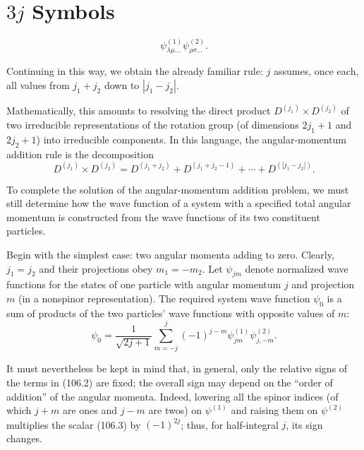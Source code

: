 \section{$3j$ Symbols}




\begin{equation}
 \psi^{(1)}_{\lambda\mu\ldots}\psi^{(2)}_{\rho\sigma\ldots}.
 \tag{106.1}
\end{equation}


Continuing in this way, we obtain the already familiar rule: $j$ assumes, once each, all values from $j_1+j_2$ down to $|j_1-j_2|$.

Mathematically, this amounts to resolving the direct product $D^{(j_1)}\times D^{(j_2)}$ of two irreducible representations of the rotation group (of dimensions $2j_1+1$ and $2j_2+1$) into irreducible components. In this language, the angular-momentum addition rule is the decomposition
\[
 D^{(j_1)}\times D^{(j_2)}=D^{(j_1+j_2)}+D^{(j_1+j_2-1)}+\cdots+D^{(|j_1-j_2|)}.
\]

To complete the solution of the angular-momentum addition problem, we must still determine how the wave function of a system with a specified total angular momentum is constructed from the wave functions of its two constituent particles.

Begin with the simplest case: two angular momenta adding to zero. Clearly, $j_1=j_2$ and their projections obey $m_1=-m_2$. Let $\psi_{jm}$ denote normalized wave functions for the states of one particle with angular momentum $j$ and projection $m$ (in a nonspinor representation). The required system wave function $\psi_0$ is a sum of products of the two particles' wave functions with opposite values of $m$:
\begin{equation}
 \psi_0=\frac{1}{\sqrt{2j+1}}\sum_{m=-j}^{j}(-1)^{j-m}\psi^{(1)}_{jm}\psi^{(2)}_{j,-m}.
 \tag{106.2}
\end{equation}


It must nevertheless be kept in mind that, in general, only the relative signs of the terms in (106.2) are fixed; the overall sign may depend on the
``order of addition'' of the angular momenta. Indeed, lowering all the spinor indices (of which $j+m$ are ones and $j-m$ are twos) on $\psi^{(1)}$ and raising them on $\psi^{(2)}$ multiplies the scalar (106.3) by $(-1)^{2j}$; thus, for half-integral $j$, its sign changes.

